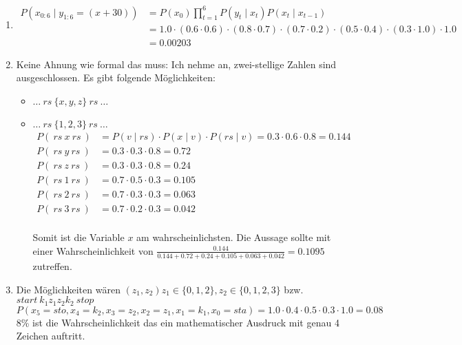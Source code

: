 \documentclass[a4paper,10pt]{article}
\begin{document}
\begin{enumerate}[~~(a)]
\begin{center}
    \end{center}
    \item
    \begin{align*}
        P(x_{0:6} \mid y_{1:6} = (x+30)) &= P(x_0)\prod_{t=1}^{6}P(y_t\mid x_t)P(x_t\mid x_{t - 1}) \\
        &= 1.0  \cdot (0.6 \cdot 0.6) \cdot (0.8 \cdot 0.7) \cdot (0.7 \cdot 0.2) \cdot (0.5 \cdot 0.4) \cdot (0.3 \cdot 1.0) \cdot 1.0 \\
        &= 0.00203
    \end{align*}

    \item Keine Ahnung wie formal das muss: Ich nehme an, zwei-stellige Zahlen sind ausgeschlossen. Es gibt folgende Möglichkeiten:
    \begin{itemize}
        \item $\dots ~rs~ \{x, y, z\} ~rs~ \dots$
        \item $\dots ~rs~ \{1, 2 ,3\} ~rs~ \dots$
        \begin{align*}
            P(~rs~ x ~rs~) &= P(v \mid rs) \cdot P(x \mid v) \cdot P(rs \mid v) = 0.3 \cdot 0.6 \cdot 0.8 = 0.144 \\
            P(~rs~ y ~rs~) &= 0.3 \cdot 0.3 \cdot 0.8 = 0.72 \\
            P(~rs~ z ~rs~) &= 0.3 \cdot 0.3 \cdot 0.8 = 0.24 \\
            P(~rs~ 1 ~rs~) &= 0.7 \cdot 0.5 \cdot 0.3 = 0.105 \\
            P(~rs~ 2 ~rs~) &= 0.7 \cdot 0.3 \cdot 0.3 = 0.063 \\
            P(~rs~ 3 ~rs~) &= 0.7 \cdot 0.2 \cdot 0.3 = 0.042 \\
        \end{align*}

        Somit ist die Variable $x$ am wahrscheinlichsten. Die Aussage sollte mit einer Wahrscheinlichkeit von $\frac{0.144}{0.144 + 0.72 + 0.24 + 0.105 + 0.063 + 0.042} = 0.1095$ zutreffen.

    \end{itemize}
    \item Die Möglichkeiten wären $(z_1, z_2) z_1 \in \{0,1,2\}, z_2 \in \{0,1,2,3\}$ bzw. $start~k_1 z_1 z_2 k_2~stop$
    $$P(x_5 = sto,x_4 = k_2, x_3 = z_2, x_2 = z_1, x_1 = k_1, x_0 = sta) = 1.0 \cdot 0.4 \cdot 0.5 \cdot 0.3 \cdot 1.0 = 0.08$$
    8\% ist die Wahrscheinlichkeit das ein mathematischer Ausdruck mit genau 4 Zeichen auftritt.
\end{enumerate}
\end{document}
